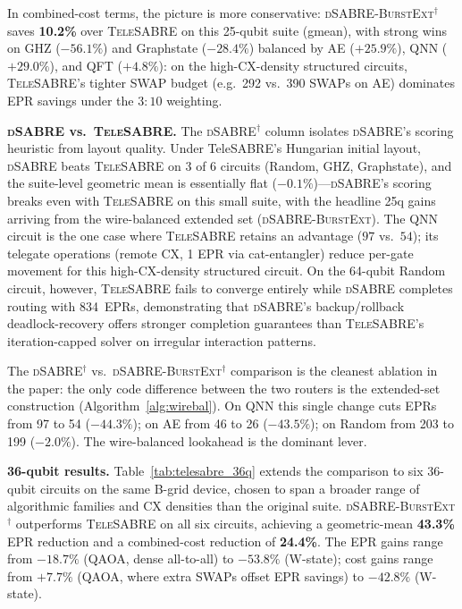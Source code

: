 \documentclass[conference]{IEEEtran}
\newcommand{\dSABRE}{\textsc{dSABRE}}
\newcommand{\BurstExt}{\textsc{dSABRE-BurstExt}}
\newcommand{\TeleSABRE}{\textsc{TeleSABRE}}
\begin{document}
In combined-cost terms, the picture is more conservative:
\BurstExt$^{\dagger}$ saves \textbf{10.2\%} over \TeleSABRE{} on this 25-qubit
suite (gmean), with strong wins on GHZ ($-56.1\%$) and Graphstate ($-28.4\%$)
balanced by AE ($+25.9\%$), QNN ($+29.0\%$), and QFT ($+4.8\%$):
on the high-CX-density structured circuits, \TeleSABRE{}'s tighter SWAP
budget (e.g.\ 292 vs.\ 390 SWAPs on AE) dominates EPR savings under the
$3{:}10$ weighting.

\textbf{\dSABRE{} vs.\ \TeleSABRE{}.}
The \dSABRE$^{\dagger}$ column isolates \dSABRE{}'s scoring heuristic from
layout quality.
Under TeleSABRE's Hungarian initial layout, \dSABRE{} beats \TeleSABRE{} on
3 of 6 circuits (Random, GHZ, Graphstate), and the suite-level geometric
mean is essentially flat (\textbf{$-0.1\%$})---\dSABRE{}'s scoring breaks
even with \TeleSABRE{} on this small suite, with the headline 25q gains
arriving from the wire-balanced extended set (\BurstExt{}).
The QNN circuit is the one case where \TeleSABRE{} retains an advantage
($97$ vs.\ $54$); its telegate operations (remote CX, 1 EPR via cat-entangler) reduce
per-gate movement for this high-CX-density structured circuit.
On the 64-qubit Random circuit, however, \TeleSABRE{} fails to converge
entirely while \dSABRE{} completes routing with 834~EPRs, demonstrating that
\dSABRE{}'s backup/rollback deadlock-recovery offers stronger completion
guarantees than \TeleSABRE{}'s iteration-capped solver on irregular
interaction patterns.

The \dSABRE$^{\dagger}$ vs.\ \BurstExt$^{\dagger}$ comparison is the cleanest
ablation in the paper: the only code difference between the two routers is
the extended-set construction (Algorithm~\ref{alg:wirebal}).
On QNN this single change cuts EPRs from 97 to 54 ($-44.3\%$); on AE from
46 to 26 ($-43.5\%$); on Random from 203 to 199 ($-2.0\%$).
The wire-balanced lookahead is the dominant lever.

\textbf{36-qubit results.}
Table~\ref{tab:telesabre_36q} extends the comparison to six 36-qubit
circuits on the same B-grid device, chosen to span a broader range of
algorithmic families and CX densities than the original suite.
\BurstExt$^{\dagger}$ outperforms \TeleSABRE{} on all six circuits,
achieving a geometric-mean \textbf{43.3\%} EPR reduction and a combined-cost
reduction of \textbf{24.4\%}.
The EPR gains range from $-18.7\%$ (QAOA, dense all-to-all) to $-53.8\%$
(W-state); cost gains range from $+7.7\%$ (QAOA, where extra SWAPs offset
EPR savings) to $-42.8\%$ (W-state).
\end{document}
